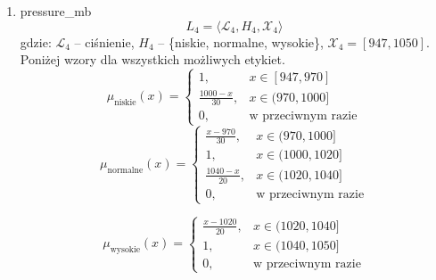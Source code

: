 \documentclass{article}
\begin{document}
\begin{enumerate}
    \item pressure\_mb
        \begin{equation}
            L_4 = \langle \mathcal{L}_4, H_4, \mathcal{X}_4 \rangle
        \end{equation}
        gdzie: $\mathcal{L}_4$ – ciśnienie, $H_4$ – \{niskie, normalne, wysokie\}, $\mathcal{X}_4 = [947, 1050]$. \\
        Poniżej wzory dla wszystkich możliwych etykiet.
                \begin{equation}
                    \mu_{\text{niskie}}(x) =
                    \begin{cases}
                    1, & x \in [947, 970] \\
                    \frac{1000 - x}{30}, & x \in (970, 1000] \\
                    0, & \text{w przeciwnym razie}
                    \end{cases}
              \end{equation}
                \begin{equation}
                   \mu_{\text{normalne}}(x) =
                    \begin{cases}
                    \frac{x - 970}{30}, & x \in (970, 1000] \\
                    1, & x \in (1000, 1020] \\
                    \frac{1040 - x}{20}, & x \in (1020, 1040] \\
                    0, & \text{w przeciwnym razie}
                    \end{cases}
                \end{equation}

                \begin{equation}
                \mu_{\text{wysokie}}(x) =
                    \begin{cases}
                    \frac{x - 1020}{20}, & x \in (1020, 1040] \\
                    1, & x \in (1040, 1050] \\
                    0, & \text{w przeciwnym razie}
                    \end{cases}
                \end{equation}


\end{enumerate}
\end{document}
